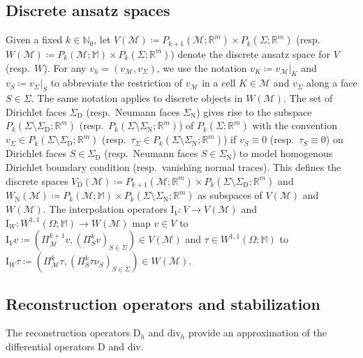 \documentclass[a4paper]{amsart}
\numberwithin{equation}{section}
\newcommand{\R}{\mathbb{R}}
\renewcommand{\div}{\mathrm{div}}
\newcommand{\I}{\mathrm{I}}
\newcommand{\Mcal}{\mathcal{M}}
\newcommand{\D}{\mathrm{D}}
\newcommand{\M}{\mathbb{M}}
\theoremstyle{remark}
\begin{document}
\subsection{Discrete ansatz spaces}\label{sec:discrete-spaces}
Given a fixed $k \in \mathbb{N}_0$, let $V(\mathcal{M}) \coloneqq P_{k+1}(\mathcal{M};\R^m) \times P_k(\Sigma;\R^m)$ (resp.~$W(\mathcal{M}) \coloneqq P_k(\mathcal{M};\M) \times P_k(\Sigma;\R^m)$) denote the discrete ansatz space for $V$ (resp.~$W$).
For any $v_h = (v_\Mcal, v_\Sigma)$, we use the notation $v_K \coloneqq v_\Mcal|_K$ and $v_S \coloneqq v_\Sigma|_S$ to abbreviate the restriction of $v_\Mcal$ in a cell $K \in \Mcal$ and $v_\Sigma$ along a face $S \in \Sigma$.
The same notation applies to discrete objects in $W(\Mcal)$.
The set of Dirichlet faces $\Sigma_\mathrm{D}$ (resp.~Neumann faces $\Sigma_\mathrm{N}$) gives rise to the subspace $P_k(\Sigma \setminus \Sigma_\mathrm{D};\R^m)$ (resp.~$P_k(\Sigma \setminus \Sigma_\mathrm{N};\R^m)$) of $P_k(\Sigma;\R^m)$ with the convention $v_\Sigma \in P_k(\Sigma \setminus \Sigma_\mathrm{D};\R^m)$ (resp.~$\tau_\Sigma \in P_k(\Sigma \setminus \Sigma_\mathrm{N};\R^m)$) if $v_S \equiv 0$ (resp.~$\tau_S \equiv 0$) on Dirichlet faces $S \in \Sigma_\mathrm{D}$ (resp.~Neumann faces $S \in \Sigma_\mathrm{N}$) to model homogenous Dirichlet boundary condition (resp.~vanishing normal traces).
This defines the discrete spaces $V_\mathrm{D}(\mathcal{M}) \coloneqq P_{k+1}(\mathcal{M};\mathbb{R}^m) \times P_k(\Sigma \setminus \Sigma_\mathrm{D}; \mathbb{R}^m)$ and $W_\mathrm{N}(\mathcal{M}) \coloneqq P_k(\mathcal{M};\mathbb{M}) \times P_k(\Sigma \setminus \Sigma_\mathrm{N};\mathbb{R}^m)$ as subspaces of $V(\Mcal)$ and $W(\Mcal)$.
The interpolation operators $\I_V: V \to V(\mathcal{M})$ and $\I_W : W^{1,1}(\Omega;\M) \to W(\Mcal)$ map $v \in V$ to $\I_V v \coloneqq (\Pi_\Mcal^{k+1} v, (\Pi_S^k v)_{S \in \Sigma}) \in V(\Mcal)$ and $\tau \in W^{1,1}(\Omega;\M)$ to $\I_W \tau \coloneqq (\Pi_\Mcal^k \tau, (\Pi_S^k \tau \nu_S)_{S\in \Sigma}) \in W(\Mcal)$.

\subsection{Reconstruction operators and stabilization}
The reconstruction operators $\D_h$ and $\div_h$ provide an approximation of the differential operators $\D$ and $\div$.\\[-0.8em]
\end{document}
